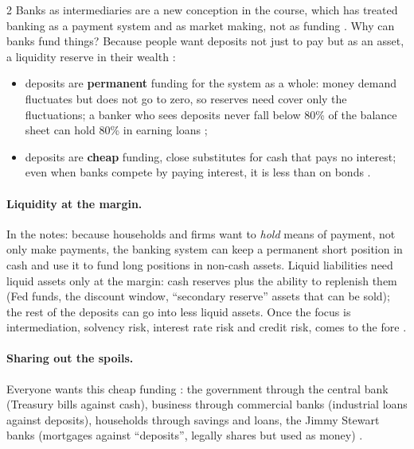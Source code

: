 \begin{paracol}{2}
Banks as intermediaries are a new conception in the course, which has treated banking as a payment system and as market making, not as funding
. Why can banks fund things? Because people want deposits not just to pay but as an asset, a liquidity reserve in their wealth
:
\begin{itemize}
  \item deposits are \textbf{permanent} funding for the system as a whole: money demand fluctuates but does not go to zero, so reserves need cover only the
        fluctuations; a banker who sees deposits never fall below 80\% of the balance sheet can hold 80\% in earning loans ;
  \item deposits are \textbf{cheap} funding, close substitutes for cash that pays no interest; even when banks compete by paying interest, it is less than on bonds
        .
\end{itemize}

\paragraph{Liquidity at the margin.} In the notes: because households and firms want to \emph{hold} means of payment, not only make payments, the banking system can keep a permanent
short position in cash and use it to fund long positions in non-cash assets. Liquid liabilities need liquid assets only at the margin: cash reserves plus the ability to replenish them (Fed funds,
the discount window, ``secondary reserve'' assets that can be sold); the rest of the deposits can go into less liquid assets. Once the focus is intermediation, solvency risk, interest rate risk and
credit risk, comes to the fore .

\paragraph{Sharing out the spoils.} Everyone wants this cheap funding : the government through the central bank (Treasury bills
against cash), business through commercial banks (industrial loans against deposits), households through savings and loans, the Jimmy Stewart banks (mortgages
against ``deposits'', legally shares but used as money) .

\begin{nfigure}
\begin{taccts}
\quad
{}\quad
{}
\end{taccts}
\caption{Cheap permanent funding shared out among government, business and households .}\label{fig:di-spoils}
\end{nfigure}


\end{paracol}
